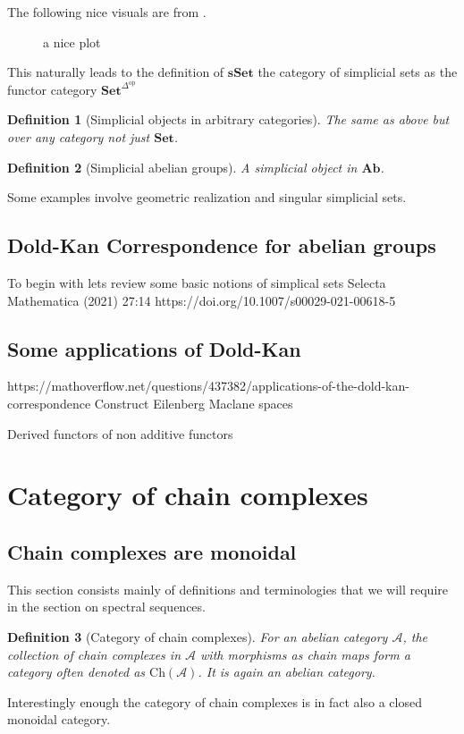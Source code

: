 \documentclass[12pt]{article}
\numberwithin{equation}{section}
\newtheorem{definition}{Definition}[section]
\begin{document}
	The following nice visuals are from \cite{friedman2023elementary}.
		\begin{figure}[h]
		\centering
		\caption{a nice plot}
		\label{fig:mesh1}
	\end{figure}

	This naturally leads to the definition of $\mathbf{sSet}$ the category of simplicial sets as the functor category $\mathbf{Set}^{\Delta^\mathrm{op}}$
	\begin{definition}[Simplicial objects in arbitrary categories]
		The same as above but over any category not just $\mathbf{Set}$.
	\end{definition}
	
	\begin{definition}[Simplicial abelian groups]
		A simplicial object in $\mathbf{Ab}$.
	\end{definition}
	
	Some examples involve geometric realization and singular simplicial sets.
	
	\subsection{Dold-Kan Correspondence for abelian groups}
	
	To begin with lets review some basic notions of simplical sets
	Selecta Mathematica (2021) 27:14
	https://doi.org/10.1007/s00029-021-00618-5	
	\subsection{Some applications of Dold-Kan}
	https://mathoverflow.net/questions/437382/applications-of-the-dold-kan-correspondence
	Construct Eilenberg Maclane spaces
	
	Derived functors of non additive functors
	\section{Category of chain complexes}
	\subsection{Chain complexes are monoidal}
	This section consists mainly of definitions and terminologies that we will require in the section on spectral sequences.
	\begin{definition}[Category of chain complexes]
		For an abelian category $\mathcal{A}$, the collection of chain complexes in $\mathcal{A}$ with morphisms as chain maps form a category often denoted as $\mathrm{Ch}(\mathcal{A})$. It is again an abelian category.
	\end{definition}
	Interestingly enough the category of chain complexes is in fact also a closed monoidal category.
	
\end{document}
